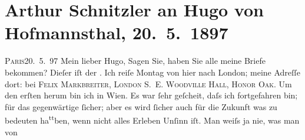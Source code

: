 

         
         \renewcommand{\erwaehntePersonen}{Personen: Richard Beer-Hofmann, Paul Goldmann, Hugo von Hofmannsthal, Hugo August von Hofmannsthal, Anna von Hofmannsthal, Felix Markbreiter}
         \renewcommand{\erwaehnteOrte}{Orte: Bad Ischl, Bayreuth, Honor Oak, London, Paris, Wien}
         \renewcommand{\erwaehnteWerke}{}
               \section[Arthur Schnitzler an Hugo von Hofmannsthal, 20. 5. 1897]{ Arthur Schnitzler an Hugo von Hofmannsthal, 20. 5. 1897}\nopagebreak{}\rehead{ }\begin{ledgroupsized}[t]{13cm}\normalsize\beginnumbering{} \toendnotes[C]{\smallbreak\pagebreak[2]} 
\toendnotes[C]{\smallbreak}\pstart
           \raggedleft{}{\pb}\textsc{Paris}20. 5. 97\pend
           \pstart
           Mein lieber Hugo, Sagen Sie, haben Sie alle meine Briefe bekommen?
               Dieſer iſt der \uline{\label{K_L00679-1v}\label{K_L00679-1h}}.\pend
           \pstart
           Ich reiſe Montag von hier nach London; meine
               Adreſſe dort: bei \textsc{Felix Markbreiter, London S. E. Woodville Hall, Honor Oak.}\pend
           \pstart
           Um den erſten herum bin ich in Wien.
               Es war ſehr geſcheit, daſs ich fortgefahren bin; für {\pb}das
               gegenwärtige ſicher; aber es wird ſicher auch für die Zukunft was zu bedeuten ha\substVorne{}\textsuperscript{tt}\substDazwischen{}b\substHinten{}en, wenn nicht alles Erleben Unſinn iſt. Man weiſs ja nie, was man von

\end{ledgroupsized}
